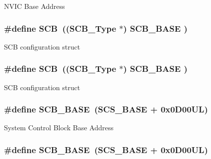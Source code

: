 N\-V\-I\-C Base Address \hypertarget{group___c_m_s_i_s__core__register_gaaaf6477c2bde2f00f99e3c2fd1060b01}{
\subsubsection[{S\-C\-B}]{\setlength{\rightskip}{0pt plus 5cm}\#define S\-C\-B~(({\bf S\-C\-B\-\_\-\-Type}       $\ast$)     {\bf S\-C\-B\-\_\-\-B\-A\-S\-E}      )}}\label{group___c_m_s_i_s__core__register_gaaaf6477c2bde2f00f99e3c2fd1060b01}
S\-C\-B configuration struct \hypertarget{group___c_m_s_i_s__core__register_gaaaf6477c2bde2f00f99e3c2fd1060b01}{
\subsubsection[{S\-C\-B}]{\setlength{\rightskip}{0pt plus 5cm}\#define S\-C\-B~(({\bf S\-C\-B\-\_\-\-Type}       $\ast$)     {\bf S\-C\-B\-\_\-\-B\-A\-S\-E}      )}}\label{group___c_m_s_i_s__core__register_gaaaf6477c2bde2f00f99e3c2fd1060b01}
S\-C\-B configuration struct \hypertarget{group___c_m_s_i_s__core__register_gad55a7ddb8d4b2398b0c1cfec76c0d9fd}{
\subsubsection[{S\-C\-B\-\_\-\-B\-A\-S\-E}]{\setlength{\rightskip}{0pt plus 5cm}\#define S\-C\-B\-\_\-\-B\-A\-S\-E~({\bf S\-C\-S\-\_\-\-B\-A\-S\-E} +  0x0\-D00\-U\-L)}}\label{group___c_m_s_i_s__core__register_gad55a7ddb8d4b2398b0c1cfec76c0d9fd}
System Control Block Base Address \hypertarget{group___c_m_s_i_s__core__register_gad55a7ddb8d4b2398b0c1cfec76c0d9fd}{
\subsubsection[{S\-C\-B\-\_\-\-B\-A\-S\-E}]{\setlength{\rightskip}{0pt plus 5cm}\#define S\-C\-B\-\_\-\-B\-A\-S\-E~({\bf S\-C\-S\-\_\-\-B\-A\-S\-E} +  0x0\-D00\-U\-L)}}\label{group___c_m_s_i_s__core__register_gad55a7ddb8d4b2398b0c1cfec76c0d9fd}
